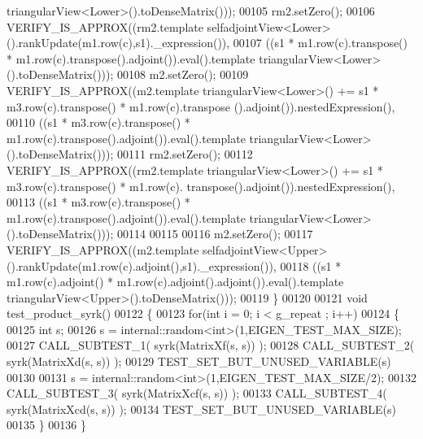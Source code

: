 \begin{DoxyCode}
      triangularView<Lower>().toDenseMatrix()));
00105   rm2.setZero();
00106   VERIFY\_IS\_APPROX((rm2.template selfadjointView<Lower>().rankUpdate(m1.row(c),s1).\_expression()),
00107                    ((s1 * m1.row(c).transpose() * m1.row(c).transpose().adjoint()).eval().template 
      triangularView<Lower>().toDenseMatrix()));
00108   m2.setZero();
00109   VERIFY\_IS\_APPROX((m2.template triangularView<Lower>() += s1 * m3.row(c).transpose() * m1.row(c).transpose
      ().adjoint()).nestedExpression(),
00110                    ((s1 * m3.row(c).transpose() * m1.row(c).transpose().adjoint()).eval().template 
      triangularView<Lower>().toDenseMatrix()));
00111   rm2.setZero();
00112   VERIFY\_IS\_APPROX((rm2.template triangularView<Lower>() += s1 * m3.row(c).transpose() * m1.row(c).
      transpose().adjoint()).nestedExpression(),
00113                    ((s1 * m3.row(c).transpose() * m1.row(c).transpose().adjoint()).eval().template 
      triangularView<Lower>().toDenseMatrix()));
00114   
00115   
00116   m2.setZero();
00117   VERIFY\_IS\_APPROX((m2.template selfadjointView<Upper>().rankUpdate(m1.row(c).adjoint(),s1).\_expression()),
00118                    ((s1 * m1.row(c).adjoint() * m1.row(c).adjoint().adjoint()).eval().template 
      triangularView<Upper>().toDenseMatrix()));
00119 \}
00120 
00121 \textcolor{keywordtype}{void} test\_product\_syrk()
00122 \{
00123   \textcolor{keywordflow}{for}(\textcolor{keywordtype}{int} i = 0; i < g\_repeat ; i++)
00124   \{
00125     \textcolor{keywordtype}{int} s;
00126     s = internal::random<int>(1,EIGEN\_TEST\_MAX\_SIZE);
00127     CALL\_SUBTEST\_1( syrk(MatrixXf(s, s)) );
00128     CALL\_SUBTEST\_2( syrk(MatrixXd(s, s)) );
00129     TEST\_SET\_BUT\_UNUSED\_VARIABLE(s)
00130     
00131     s = internal::random<int>(1,EIGEN\_TEST\_MAX\_SIZE/2);
00132     CALL\_SUBTEST\_3( syrk(MatrixXcf(s, s)) );
00133     CALL\_SUBTEST\_4( syrk(MatrixXcd(s, s)) );
00134     TEST\_SET\_BUT\_UNUSED\_VARIABLE(s)
00135   \}
00136 \}
\end{DoxyCode}
